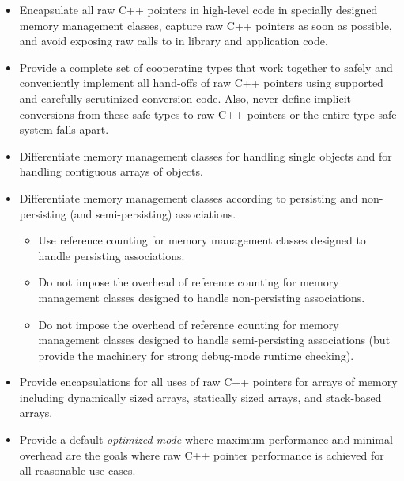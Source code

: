\documentclass[pdf,ps2pdf,11pt]{SANDreport}
\begin{document}
\begin{itemize}

{}\item Encapsulate all raw C++ pointers in high-level code in
specially designed memory management classes, capture raw C++ pointers
as soon as possible, and avoid exposing raw calls to {} in
library and application code.

{}\item Provide a complete set of cooperating types that work together
to safely and conveniently implement all hand-offs of raw C++ pointers
using supported and carefully scrutinized conversion code.  Also,
never define implicit conversions from these safe types to raw C++
pointers or the entire type safe system falls apart.

{}\item Differentiate memory management classes for handling single
objects and for handling contiguous arrays of objects.

{}\item Differentiate memory management classes according to
persisting and non-persisting (and semi-persisting) associations.

  \begin{itemize}

  {}\item Use reference counting for memory management classes
  designed to handle persisting associations.

  {}\item Do not impose the overhead of reference counting for memory
  management classes designed to handle non-persisting associations.

  {}\item Do not impose the overhead of reference counting for memory
  management classes designed to handle semi-persisting associations
  (but provide the machinery for strong debug-mode runtime checking).

  \end{itemize}

{}\item Provide encapsulations for all uses of raw C++ pointers for
arrays of memory including dynamically sized arrays, statically sized
arrays, and stack-based arrays.

{}\item Provide a default {}\textit{optimized mode} where maximum
performance and minimal overhead are the goals where raw C++ pointer
performance is achieved for all reasonable use cases.


\end{itemize}
\end{document}

